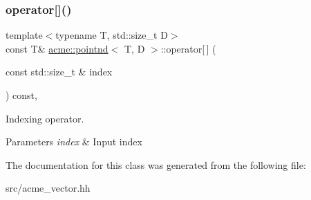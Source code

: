 \subsubsection{\texorpdfstring{operator[]()}{operator[]()}\hspace{0.1cm}{\footnotesize\ttfamily [2/2]}}
{\footnotesize\ttfamily template$<$typename T, std\+::size\+\_\+t D$>$ \\
const T\& \hyperlink{classacme_1_1pointnd}{acme\+::pointnd}$<$ T, D $>$\+::operator\mbox{[}$\,$\mbox{]} (\begin{DoxyParamCaption}\item[{const std\+::size\+\_\+t \&}]{index }\end{DoxyParamCaption}) const\hspace{0.3cm}{\ttfamily [inline]}, {\ttfamily [inherited]}}



Indexing operator. 


\begin{DoxyParams}{Parameters}
{\em index} & Input index \\
\hline
\end{DoxyParams}


The documentation for this class was generated from the following file\+:\begin{DoxyCompactItemize}
\item 
src/acme\+\_\+vector.\+hh\end{DoxyCompactItemize}
